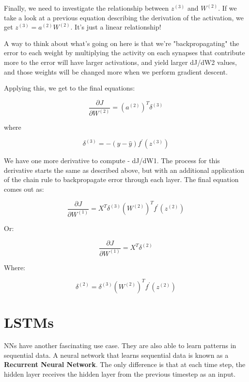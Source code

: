\documentclass[]{article}
\begin{document}
Finally, we need to investigate the relationship between $z^{(3)}$ and $W^({2})$. If we take a look at a previous equation describing the derivation of the activation, we get $z^{(3)} = a^{(2)}W^{(2)}$. It's just a linear relationship!

A way to think about what's going on here is that we're "backpropagating" the error to each weight by multiplying the activity on each synapses that contribute more to the error will have larger activations, and yield larger dJ/dW2 values, and those weights will be changed more when we perform gradient descent. 

Applying this, we get to the final equations:

\begin{equation}
\frac{\partial J}{\partial W^{(2)}} = 
(a^{(2)})^T\delta^{(3)}\tag{6}
\end{equation}

where

\begin{equation}
\delta^{(3)} = -(y-\hat{y}) f^\prime(z^{(3)}) 
\end{equation}

We have one more derivative to compute - dJ/dW1. The process for this derivative starts the same as described above, but with an additional application of the chain rule to backpropagate error through each layer. The final equation comes out as: 

\begin{equation}
\frac{\partial J}{\partial W^{(1)}} = 
X^{T}
\delta^{(3)} 
(W^{(2)})^{T}
f^\prime(z^{(2)})
\end{equation}

Or: 

\begin{equation}
\frac{\partial J}{\partial W^{(1)}} = 
X^{T}\delta^{(2)} \tag{7}
\end{equation}

Where: 

\begin{equation}
\delta^{(2)} = \delta^{(3)} 
(W^{(2)})^{T}
f^\prime(z^{(2)})
\end{equation}

\section{LSTMs}

NNs have another fascinating use case. They are also able to learn patterns in sequential data. A neural network that learns sequential data is known as a \textbf{Recurrent Neural Network}. The only difference is that at each time step, the hidden layer receives the hidden layer from the previous timestep as an input.
\end{document}
